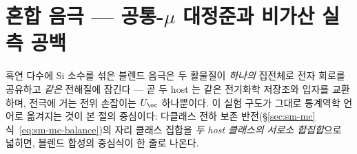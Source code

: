 \section{혼합 음극 --- 공통-$\mu$ 대정준과 비가산 실측 공백}\label{sec:si-blend}
흑연 다수에 Si 소수를 섞은 블렌드 음극은 두 활물질이 \emph{하나의} 집전체로 전자 회로를 공유하고 \emph{같은}
전해질에 잠긴다 --- 곧 두 host 는 같은 전기화학 저장조와 입자를 교환하며, 전극에 거는 전위 손잡이는
$U_\oc$ 하나뿐이다. 이 실험 구도가 그대로 통계역학 언어로 옮겨지는 것이 본 절의 중심이다: 다클래스 전하
보존 반전(\S\ref{sec:sm-mc} 식~\eqref{eq:sm-mc-balance})의 자리 클래스 집합을 \emph{두 host 클래스의 서로소
합집합}으로 넓히면, 블렌드 합성의 중심식이 한 줄로 나온다.

